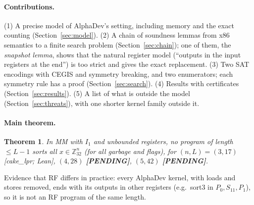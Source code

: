 \documentclass[11pt]{article}
\newtheorem{theorem}{Theorem}\newtheorem{lemma}[theorem]{Lemma}\newtheorem{corollary}[theorem]{Corollary}
\theoremstyle{remark}\newtheorem{remark}[theorem]{Remark}
\newcommand{\pending}{\textbf{[PENDING]}}
\begin{document}
\paragraph{Contributions.}
(1) A precise model of AlphaDev's setting, including memory and the exact counting (Section~\ref{sec:model}).
(2) A chain of soundness lemmas from x86 semantics to a finite search problem (Section~\ref{sec:chain}); one of them, the
\emph{snapshot lemma}, shows that the natural register model (``outputs in the input registers at the end'') is too strict
and gives the exact replacement.
(3) Two SAT encodings with CEGIS and symmetry breaking, and two enumerators; each symmetry rule has a proof
(Section~\ref{sec:search}).
(4) Results with certificates (Section~\ref{sec:results}).
(5) A list of what is outside the model (Section~\ref{sec:threats}), with one shorter kernel family outside it.



\paragraph{Main theorem.}
\begin{theorem}\label{thm:main}
In MM with $I_1$ and unbounded registers, no program of length $\le L-1$ sorts all $x \in \mathbb{Z}_{32}^n$ (for all garbage
and flags), for $(n, L) = (3, 17)$ [cake\_lpr; Lean], $(4, 28)$ \pending, $(5, 42)$ \pending.
\end{theorem}
Evidence that RF differs in practice: every AlphaDev kernel, with loads and stores removed, ends with its outputs in other
registers (e.g.\ sort3 in $P_0, S_{11}, P_1$), so it is not an RF program of the same length.
\end{document}
